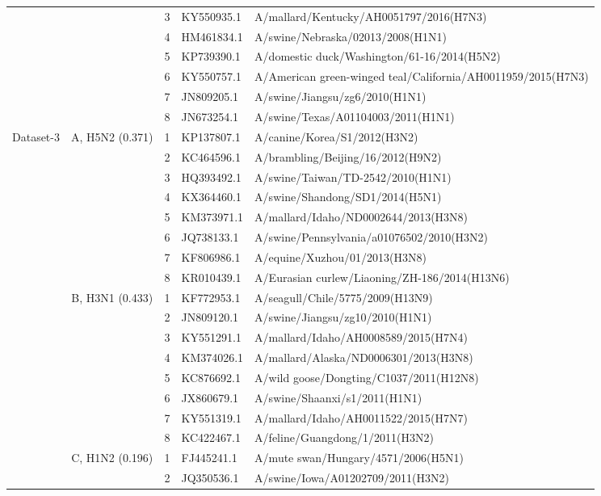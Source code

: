 \begin{table}[t]
\begin{tabular}{cclll}
 &  & 3 & KY550935.1 & A/mallard/Kentucky/AH0051797/2016(H7N3) \\
 &  & 4 & HM461834.1 & A/swine/Nebraska/02013/2008(H1N1) \\
 &  & 5 & KP739390.1 & A/domestic duck/Washington/61-16/2014(H5N2) \\
 &  & 6 & KY550757.1 & A/American green-winged teal/California/AH0011959/2015(H7N3) \\
 &  & 7 & JN809205.1 & A/swine/Jiangsu/zg6/2010(H1N1) \\
 &  & 8 & JN673254.1 & A/swine/Texas/A01104003/2011(H1N1) \\
\midrule
\multirow{24}{*}{Dataset-3} & \multirow{8}{*}{A, H5N2 (0.371)} & 1 & KP137807.1 & A/canine/Korea/S1/2012(H3N2) \\
 &  & 2 & KC464596.1 & A/brambling/Beijing/16/2012(H9N2) \\
 &  & 3 & HQ393492.1 & A/swine/Taiwan/TD-2542/2010(H1N1) \\
 &  & 4 & KX364460.1 & A/swine/Shandong/SD1/2014(H5N1) \\
 &  & 5 & KM373971.1 & A/mallard/Idaho/ND0002644/2013(H3N8) \\
 &  & 6 & JQ738133.1 & A/swine/Pennsylvania/a01076502/2010(H3N2) \\
 &  & 7 & KF806986.1 & A/equine/Xuzhou/01/2013(H3N8) \\
 &  & 8 & KR010439.1 & A/Eurasian curlew/Liaoning/ZH-186/2014(H13N6) \\
\cmidrule(l){2-5}
 & \multirow{8}{*}{B, H3N1 (0.433)} & 1 & KF772953.1 & A/seagull/Chile/5775/2009(H13N9) \\
 &  & 2 & JN809120.1 & A/swine/Jiangsu/zg10/2010(H1N1) \\
 &  & 3 & KY551291.1 & A/mallard/Idaho/AH0008589/2015(H7N4) \\
 &  & 4 & KM374026.1 & A/mallard/Alaska/ND0006301/2013(H3N8) \\
 &  & 5 & KC876692.1 & A/wild goose/Dongting/C1037/2011(H12N8) \\
 &  & 6 & JX860679.1 & A/swine/Shaanxi/s1/2011(H1N1) \\
 &  & 7 & KY551319.1 & A/mallard/Idaho/AH0011522/2015(H7N7) \\
 &  & 8 & KC422467.1 & A/feline/Guangdong/1/2011(H3N2) \\
\cmidrule(l){2-5}
 & \multirow{8}{*}{C, H1N2 (0.196)} & 1 & FJ445241.1 & A/mute swan/Hungary/4571/2006(H5N1) \\
 &  & 2 & JQ350536.1 & A/swine/Iowa/A01202709/2011(H3N2) \\

\end{tabular}
\end{table}
